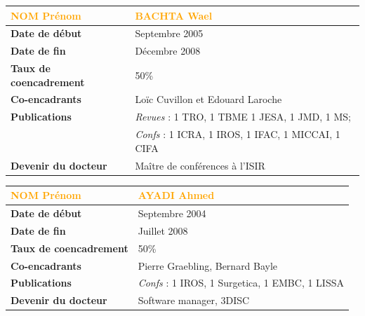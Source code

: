 \documentclass[a4paper,12pt]{article}
\newcommand{\separation}{\noindent{\color{black!40}\rule{\textwidth}{1pt}}}
\begin{document}
\newrefsection
\nocite{1-GBRP14,3-GPLD14,2-GPLD12,4-GPLD11,5-GPLG11,5-GPLD11,4-GLPG10,4-GPLG10,7-GPLG10,7-GLPG10,4-GPLG09,7-GGP07}
\printbibliography[title={\small Publications du doctorant}]

\separation{}

\newpage
%
%
\begin{table}[htbp]
\label{tab:Wael}
\centering
\begin{tabular}{>{\bfseries}ll}
\toprule %
\textup{\textcolor{orange}{NOM Prénom}} & \large{\textcolor{orange}{BACHTA Wael}}\\
\midrule
Date de début               & Septembre 2005\\
Date de fin                 & Décembre 2008\\
Taux de coencadrement       & 50\%\\
Co-encadrants               & Loïc Cuvillon et Edouard Laroche\\
Publications                & \emph{Revues} : 1 TRO, 1 TBME 1 JESA, 1 JMD, 1 MS;\\ &\emph{Confs} : 1 ICRA, 1 IROS, 1 IFAC, 1 MICCAI, 1 CIFA\\
Devenir du docteur          & Maître de conférences à l'ISIR \\
\bottomrule
\end{tabular}
\end{table}

\newrefsection
\nocite{1-GBRP14,3-BLRG12,2-BRLF11,2-BRLG11,2-RRBG11,1-BRHG10,2-BRCL09,4-BRLG09,7-BLRG09,2-BRLF08,4-BLRG08,5-BLRG08,4-BRLG07,4-BRLF07,7-BRLG07,10-BRLG07}
\printbibliography[title={\small Publications du doctorant}]

\separation{}

\newpage
%
%
\begin{table}[htbp]
\label{tab:Ahmed}
\centering
\begin{tabular}{>{\bfseries}ll}
\toprule %
\textup{\textcolor{orange}{NOM Prénom}} & \large{\textcolor{orange}{AYADI Ahmed}}\\
\midrule
Date de début               & Septembre 2004\\
Date de fin                 & Juillet 2008\\
Taux de coencadrement       & 50\%\\
Co-encadrants               & Pierre Graebling, Bernard Bayle\\
Publications                & \emph{Confs} : 1 IROS, 1 Surgetica, 1 EMBC, 1 LISSA \\
Devenir du docteur          & Software manager, 3DISC \\
\bottomrule
\end{tabular}
\end{table}

\newrefsection
\nocite{4-ABGG08,4-ANBG07,4-ABAB07,5-ABGG07,5-ANBG07,7-ANBG07}
\printbibliography[title={\small Publications du doctorant}]

\separation{}
\end{document}
